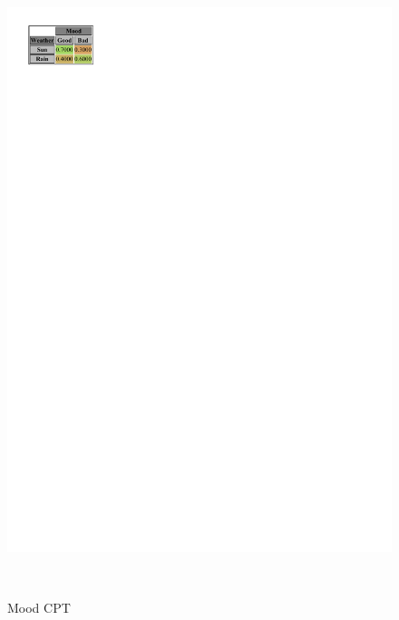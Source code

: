 \documentclass[a4paper,12pt]{article} %
\begin{document}
\begin{figure}[H]
\begin{center}
\begin{minipage}[c]{.28\textwidth}
		\includegraphics[width=.9\linewidth]{../code/mood.pdf}	
		\caption*{Mood CPT}
		\label{fig:Mood}
	\end{minipage}
	~
	\begin{minipage}[c]{.35\textwidth}
		\centering
		

\end{minipage}
\end{center}
\end{figure}
\end{document}
